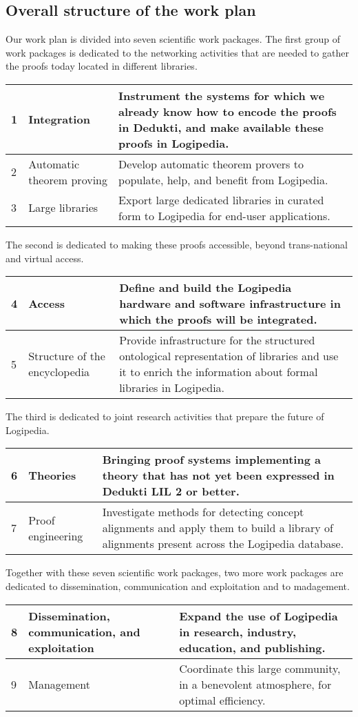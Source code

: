 \subsection{Overall structure of the work plan}

Our work plan is divided into seven scientific work packages.
The first group of work packages is dedicated to the networking
activities that are needed to gather the proofs today located in
different libraries.

\begin{longtable}{|p{}|p{}|p{}|}
\hline
1
&
Integration
&
Instrument the systems for which we already know how to encode the
proofs in Dedukti, and make available these proofs in Logipedia.
\\
\hline
2
&
Automatic theorem proving
& 
Develop automatic theorem provers to populate,
help, and benefit from Logipedia.
\\
\hline
3
&
Large libraries
&
Export large dedicated libraries in curated form 
to Logipedia for end-user applications.
\\
\hline
\end{longtable}
The second is dedicated to making these proofs accessible, beyond
trans-national and virtual access.
\begin{longtable}{|p{}|p{}|p{}|}
\hline
4
&
Access
&
Define and build the Logipedia hardware and software infrastructure in
which the proofs will be integrated.
\\
\hline
5
&
Structure of the encyclopedia
&
Provide infrastructure for the structured ontological representation
of libraries and use it to enrich the information about formal
libraries in Logipedia.
\\
\hline
\end{longtable}
The third is dedicated to joint research activities that prepare
the future of Logipedia. 
\begin{longtable}{|p{}|p{}|p{}|}
\hline
6
&
Theories
&
Bringing proof systems implementing a theory 
that has not yet been expressed in Dedukti LIL 2 or better.
\\
\hline
7&Proof engineering &
Investigate methods for detecting concept alignments and apply
them to build a library of alignments present across the Logipedia database.
\\
\hline
\end{longtable}
Together with these seven scientific work packages, 
two more work packages are dedicated to dissemination, communication and
exploitation and to madagement.
\begin{longtable}{|p{}|p{}|p{}|}
\hline
8
&
Dissemination, communication, and exploitation
&
Expand the use of Logipedia in research, industry, education, and publishing.
\\
\hline
9
&
Management
&
Coordinate this large community, in a benevolent atmosphere, for optimal
efficiency.
\\
\hline
\end{longtable}

